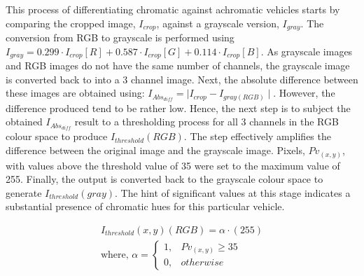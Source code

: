 This process of differentiating chromatic against achromatic vehicles starts by comparing the cropped image, $I_{crop}$, against a grayscale version, $I_{gray}$.
The conversion from RGB to grayscale is performed using $I_{gray} = 0.299 \cdot I_{crop}[R]+0.587 \cdot I_{crop}[G]+0.114 \cdot I_{crop}[B]$.
As grayscale images and RGB images do not have the same number of channels, the grayscale image is converted back to into a 3 channel image.
Next, the absolute difference between these images are obtained using: $I_{Abs_{diff}} = \mid I_{crop} - I_{gray(RGB)} \mid$.
However, the difference produced tend to be rather low.
Hence, the next step is to subject the obtained $I_{Abs_{diff}}$ result to a thresholding process for all 3 channels in the RGB colour space to produce $I_{threshold}(RGB)$.
The step effectively amplifies the difference between the original image and the grayscale image. Pixels, $Pv_{(x,y)}$, with values above the threshold value of 35 were set to the maximum value of 255.
Finally, the output %
is converted back to the grayscale colour space to generate $I_{threshold}(gray)$. The hint of significant values at this stage indicates a substantial presence of chromatic hues for this particular vehicle.

\begin{align*}
\label{eq:threshabsolutediff}
I_{threshold}(x,y)(RGB) = \alpha \cdot (255) \\
\text{where, }
\alpha =
\begin{cases}
1, & Pv_{(x,y)} \geq 35\\
0, & otherwise
\end{cases}
\end{align*}



